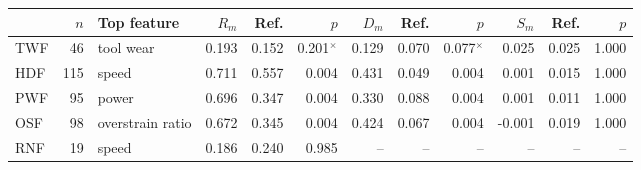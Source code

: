 \begin{tabular}{@{}lrlrrrrrrrrr@{}}
\toprule
& $n$ & Top feature & $R_m$ & Ref. & $p$ & $D_m$ & Ref. & $p$ & $S_m$ & Ref. & $p$ \\
\midrule
TWF & 46 & tool wear & 0.193 & 0.152 & 0.201$^{\times}$ & 0.129 & 0.070 & 0.077$^{\times}$ & 0.025 & 0.025 & 1.000 \\
HDF & 115 & speed & 0.711 & 0.557 & 0.004 & 0.431 & 0.049 & 0.004 & 0.001 & 0.015 & 1.000 \\
PWF & 95 & power & 0.696 & 0.347 & 0.004 & 0.330 & 0.088 & 0.004 & 0.001 & 0.011 & 1.000 \\
OSF & 98 & overstrain ratio & 0.672 & 0.345 & 0.004 & 0.424 & 0.067 & 0.004 & -0.001 & 0.019 & 1.000 \\
RNF & 19 & speed & 0.186 & 0.240 & 0.985 & -- & -- & -- & -- & -- & -- \\
\bottomrule
\end{tabular}
